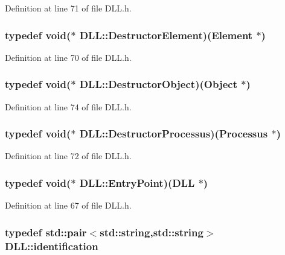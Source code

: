 Definition at line 71 of file DLL.h.\hypertarget{classDLL_a6e838cc12677c8ea48d5312984f8f18b}{
\subsubsection[{DestructorElement}]{\setlength{\rightskip}{0pt plus 5cm}typedef void($\ast$ {\bf DLL::DestructorElement})({\bf Element} $\ast$)}}
\label{classDLL_a6e838cc12677c8ea48d5312984f8f18b}


Definition at line 70 of file DLL.h.\hypertarget{classDLL_a143a49a77c9a75b043e9dba700afc45b}{
\subsubsection[{DestructorObject}]{\setlength{\rightskip}{0pt plus 5cm}typedef void($\ast$ {\bf DLL::DestructorObject})({\bf Object} $\ast$)}}
\label{classDLL_a143a49a77c9a75b043e9dba700afc45b}


Definition at line 74 of file DLL.h.\hypertarget{classDLL_a3bd20fb58c02a1a2f4e96d59da21faf5}{
\subsubsection[{DestructorProcessus}]{\setlength{\rightskip}{0pt plus 5cm}typedef void($\ast$ {\bf DLL::DestructorProcessus})({\bf Processus} $\ast$)}}
\label{classDLL_a3bd20fb58c02a1a2f4e96d59da21faf5}


Definition at line 72 of file DLL.h.\hypertarget{classDLL_a9b8086a1063fe93f3545a3d20c5ca192}{
\subsubsection[{EntryPoint}]{\setlength{\rightskip}{0pt plus 5cm}typedef void($\ast$ {\bf DLL::EntryPoint})({\bf DLL} $\ast$)}}
\label{classDLL_a9b8086a1063fe93f3545a3d20c5ca192}


Definition at line 67 of file DLL.h.\hypertarget{classDLL_aa2df9e9226052bfa93a6df56f1ca689b}{
\subsubsection[{identification}]{\setlength{\rightskip}{0pt plus 5cm}typedef std::pair$<$std::string,std::string$>$ {\bf DLL::identification}}}
\label{classDLL_aa2df9e9226052bfa93a6df56f1ca689b}


